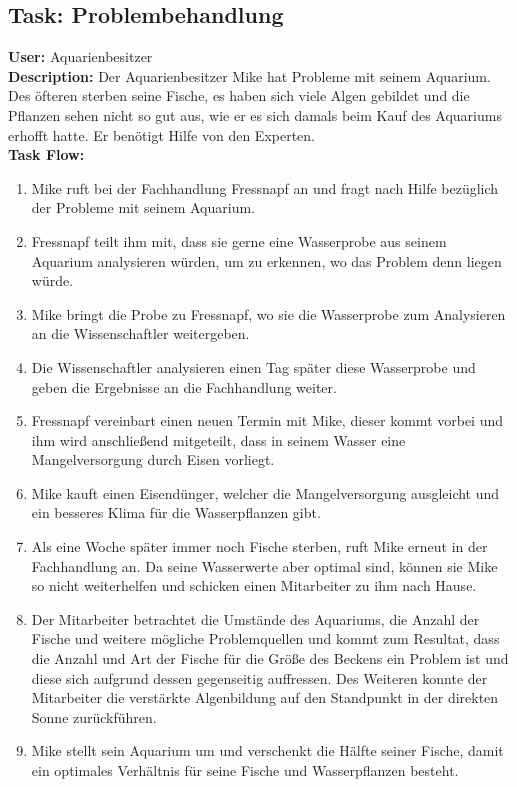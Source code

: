 \subsection{Task: Problembehandlung}
\textbf{User:} Aquarienbesitzer\\

\textbf{Description:} Der Aquarienbesitzer Mike hat Probleme mit seinem Aquarium. Des öfteren sterben seine Fische, es haben sich viele Algen gebildet und die Pflanzen sehen nicht so gut aus, wie er es sich damals beim Kauf des Aquariums erhofft hatte. Er benötigt Hilfe von den Experten.\\

\textbf{Task Flow:}
\begin{enumerate}
\item Mike ruft bei der Fachhandlung Fressnapf an und fragt nach Hilfe bezüglich der Probleme mit seinem Aquarium. 
 \item Fressnapf teilt ihm mit, dass sie gerne eine Wasserprobe aus seinem Aquarium analysieren würden, um zu erkennen, wo das Problem denn liegen würde.
 \item Mike bringt die Probe zu Fressnapf, wo sie die Wasserprobe zum Analysieren an die Wissenschaftler weitergeben.
 \item Die Wissenschaftler analysieren einen Tag später diese Wasserprobe und geben die Ergebnisse an die Fachhandlung weiter.
 \item Fressnapf vereinbart einen neuen Termin mit Mike, dieser kommt vorbei und ihm wird anschließend mitgeteilt, dass in seinem Wasser eine Mangelversorgung durch Eisen vorliegt. 
 \item Mike kauft einen Eisendünger, welcher die Mangelversorgung ausgleicht und ein besseres Klima für die Wasserpflanzen gibt.
 \item Als eine Woche später immer noch Fische sterben, ruft Mike erneut in der Fachhandlung an. Da seine Wasserwerte aber optimal sind, können sie Mike so nicht weiterhelfen und schicken einen Mitarbeiter zu ihm nach Hause.
 \item Der Mitarbeiter betrachtet die Umstände des Aquariums, die Anzahl der Fische und weitere mögliche Problemquellen und kommt zum Resultat, dass die Anzahl und Art der Fische für die Größe des Beckens ein Problem ist und diese sich aufgrund dessen gegenseitig auffressen. Des Weiteren konnte der Mitarbeiter die verstärkte Algenbildung auf den Standpunkt in der direkten Sonne zurückführen.
 \item Mike stellt sein Aquarium um und verschenkt die Hälfte seiner Fische, damit ein optimales Verhältnis für seine Fische und Wasserpflanzen besteht.
\end{enumerate}

